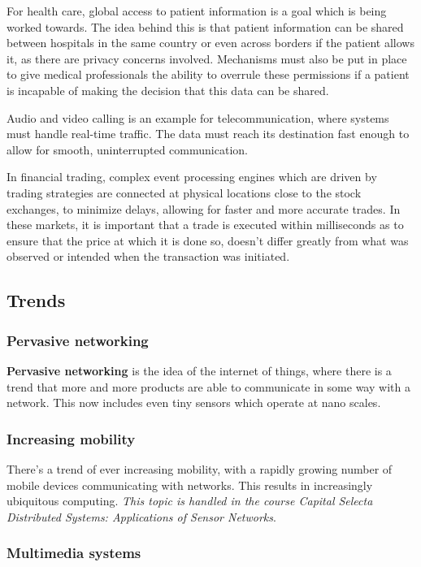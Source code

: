 \documentclass[a4paper]{article}
\begin{document}
For health care, global access to patient information is a goal which is being worked towards. The idea behind this is that patient information can be shared between hospitals in the same country or even across borders if the patient allows it, as there are privacy concerns involved. Mechanisms must also be put in place to give medical professionals the ability to overrule these permissions if a patient is incapable of making the decision that this data can be shared.

Audio and video calling is an example for telecommunication, where systems must handle real-time traffic. The data must reach its destination fast enough to allow for smooth, uninterrupted communication.

In financial trading, complex event processing engines which are driven by trading strategies are connected at physical locations close to the stock exchanges, to minimize delays, allowing for faster and more accurate trades. In these markets, it is important that a trade is executed within milliseconds as to ensure that the price at which it is done so, doesn't differ greatly from what was observed or intended when the transaction was initiated.

\subsection{Trends}

\subsubsection{Pervasive networking}

\textbf{Pervasive networking} is the idea of the internet of things, where there is a trend that more and more products are able to communicate in some way with a network. This now includes even tiny sensors which operate at nano scales.

\subsubsection{Increasing mobility}

There's a trend of ever increasing mobility, with a rapidly growing number of mobile devices communicating with networks. This results in increasingly ubiquitous computing. \textit{This topic is handled in the course Capital Selecta Distributed Systems: Applications of Sensor Networks}.

\subsubsection{Multimedia systems}
\end{document}
